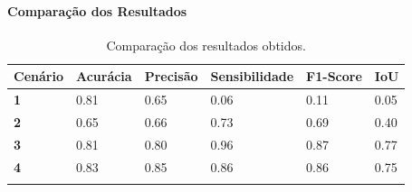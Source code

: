 \documentclass[%
  10pt,%
  aspectratio = 169,%
  compress,%
  t,%
  english,%
  brazilian,%
  tikz,
]{beamer}
\begin{document}
\begin{frame}
\framesubtitle{Comparação dos Resultados}

\begin{table}[!ht]
    \centering
    \caption{Comparação dos resultados obtidos.}%
    \label{tab:res:comparacao}%
    \begin{tabular}{llllll}
    \toprule
        \textbf{Cenário} & \textbf{Acurácia} & \textbf{Precisão} & \textbf{Sensibilidade} & \textbf{F1-Score} & \textbf{IoU} \\
        \midrule
        \textbf{1} & \colorbox{green!25}{0.81} & 0.65 & 0.06 & 0.11 & 0.05 \\ 
        \textbf{2} & \colorbox{red!25}{0.65} & 0.66 & 0.73 & 0.69 & 0.40 \\ 
        \textbf{3} & 0.81 & 0.80 & 0.96 & 0.87 & 0.77 \\ 
        \textbf{4} & 0.83 & 0.85 & 0.86 & 0.86 & 0.75 \\ 
        \bottomrule
        \addlinespace
    \end{tabular}
\end{table}

\end{frame}

\end{document}
